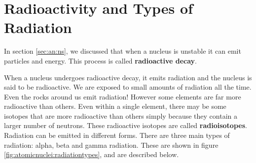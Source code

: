 



\section{Radioactivity and Types of Radiation}
\label{sec:an:r}

In section \ref{sec:an:ns}, we discussed that when a nucleus is unstable it can emit particles and energy. This process is called \textbf{radioactive decay}.


When a nucleus undergoes radioactive decay, it emits radiation and the nucleus is said to be radioactive. We are exposed to small amounts of radiation all the time. Even the rocks around us emit radiation! However some elements are far more radioactive than others. Even within a single element, there may be some isotopes that are more radioactive than others simply because they contain a larger number of neutrons. These radioactive isotopes are called \textbf{radioisotopes}.\\

Radiation can be emitted in different forms. There are three main types of radiation: alpha, beta and gamma
radiation. These are shown in figure \ref{fig:atomicnuclei:radiationtypes}, and are described below.\\

